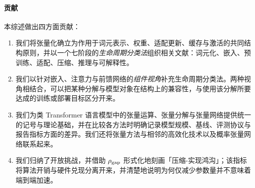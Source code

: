 \paragraph{贡献}
本综述做出四方面贡献：
\begin{enumerate}[leftmargin=*]
  \item 我们将张量化确立为作用于词元表示、权重、适配更新、缓存与激活的共同结构原则，并以一个七阶段的\emph{生命周期分类法}组织相关文献：词元化、嵌入、预训练、适配、压缩、推理与可解释性。
  \item 我们以针对嵌入、注意力与前馈网络的\emph{组件视角}补充生命周期分类法。两种视角相结合，可以把某种分解与模型对象在结构上的兼容性，与使用该分解所要达成的训练或部署目标区分开来。
  \item 我们为类 Transformer 语言模型中的张量运算、张量分解与张量网络提供统一的记号与理论基础，并在比较各方法时明确记录模型规模、基线、评测协议与报告指标方面的差异。我们还将张量方法与相邻的高效化技术以及概率张量网络联系起来。
  \item 我们归纳了开放挑战，并借助 $\rho_{\rm gap}$ 形式化地刻画「压缩-实现鸿沟」；该指标将算法开销与硬件兑现分离开来，并清楚地说明为何仅减少参数量并不意味着端到端加速。
\end{enumerate}


